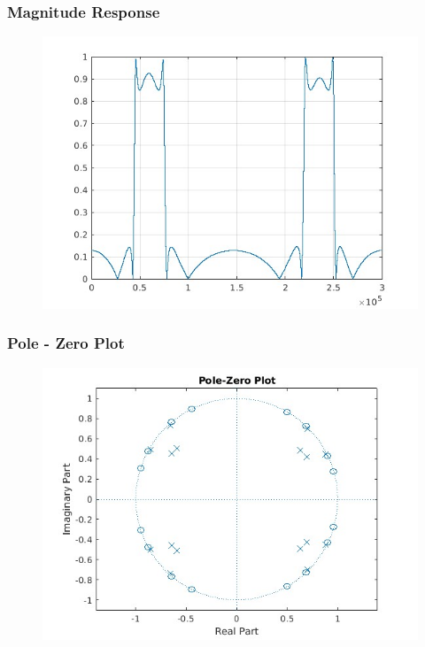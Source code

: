 \documentclass{article}
\begin{document}
\subsubsection{Magnitude Response}
\begin{figure}[H]
\hspace*{-2.5cm}
    \centering
    \includegraphics[width=1.5\linewidth, height=0.65\textheight]{multiband_IIR_Elliptic_mag.jpg}
    \label{fig:my_label}
\end{figure}

\subsubsection{Pole - Zero Plot}
\begin{figure}[H]
\hspace*{-2.5cm}
    \centering
    \includegraphics[width=1.5\linewidth, height=0.5\textheight]{pole_zero_final.jpg}
    \label{fig:my_label}
\end{figure}
\end{document}
